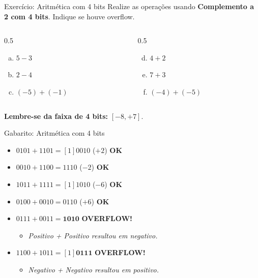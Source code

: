 \begin{frame}{Exercício: Aritmética com 4 bits}
    Realize as operações usando \textbf{Complemento a 2 com 4 bits}. Indique se houve overflow.

    \begin{columns}
        \begin{column}{0.5\textwidth}
            \begin{enumerate}[a)]
                \item $5 - 3$
                \item $2 - 4$
                \item $(-5) + (-1)$
            \end{enumerate}
        \end{column}
        \begin{column}{0.5\textwidth}
            \begin{enumerate}[d)]
                \setcounter{enumi}{3}
                \item $4 + 2$
                \item $7 + 3$
                \item $(-4) + (-5)$
            \end{enumerate}
        \end{column}
    \end{columns}

    \vspace{0.5cm}
    \textbf{Lembre-se da faixa de 4 bits:} $[-8, +7]$.
\end{frame}

\begin{frame}{Gabarito: Aritmética com 4 bits}
    \footnotesize
    \begin{itemize}
        \item[\textbf{a)}] $0101 + 1101 = [1]0010$ ($+2$) \hfill \textbf{OK}
        \item[\textbf{b)}] $0010 + 1100 = 1110$ ($-2$) \hfill \textbf{OK}
        \item[\textbf{c)}] $1011 + 1111 = [1]1010$ ($-6$) \hfill \textbf{OK}
        \item[\textbf{d)}] $0100 + 0010 = 0110$ ($+6$) \hfill \textbf{OK}
        \item[\textbf{e)}] $0111 + 0011 = \mathbf{1010}$ \hfill \textbf{OVERFLOW!}
              \begin{itemize}
                  \item \textit{Positivo + Positivo resultou em negativo.}
              \end{itemize}
        \item[\textbf{f)}] $1100 + 1011 = [1]\mathbf{0111}$ \hfill \textbf{OVERFLOW!}
              \begin{itemize}
                  \item \textit{Negativo + Negativo resultou em positivo.}
              \end{itemize}
    \end{itemize}
\end{frame}

